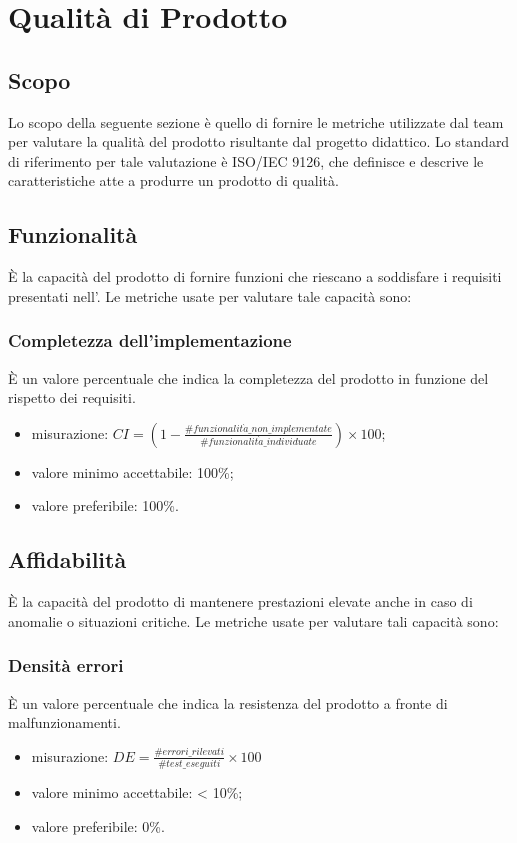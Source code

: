\section{Qualità di Prodotto}
\subsection{Scopo}
Lo scopo della seguente sezione è quello di fornire le metriche utilizzate dal team \Gruppo{} per valutare la qualità del prodotto risultante dal progetto didattico. Lo standard di riferimento per tale valutazione è ISO/IEC 9126, che definisce e descrive le caratteristiche atte a produrre un prodotto di qualità.

\subsection{Funzionalità}
È la capacità del prodotto di fornire funzioni che riescano a soddisfare i requisiti presentati nell'\textit{\AdR}.
Le metriche usate per valutare tale capacità sono:

	\subsubsection*{Completezza dell'implementazione}
	È un valore percentuale che indica la completezza del prodotto in funzione del rispetto dei requisiti.
	\begin{itemize}
	\item{misurazione: $CI = (1- \displaystyle\frac{\#funzionalit\grave{a}\_non\_implementate}{\#funzionalit\grave{a}\_individuate})\times100$};
	\item {valore minimo accettabile: 100\%;}
	\item {valore preferibile: 100\%.}
	\end{itemize}
	
\subsection{Affidabilità}
È la capacità del prodotto di mantenere prestazioni elevate anche in caso di anomalie o situazioni critiche.
Le metriche usate per valutare tali capacità sono:

	\subsubsection*{Densità errori}
	È un valore percentuale che indica la resistenza del prodotto a fronte di malfunzionamenti.
	\begin{itemize}
		\item{misurazione: $DE = \displaystyle\frac{\#errori\_rilevati}{\#test\_eseguiti}\times100$}
		\item {valore minimo accettabile: < 10\%;}
		\item {valore preferibile: 0\%.}
	\end{itemize}

